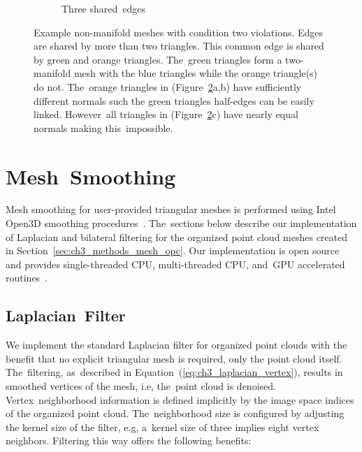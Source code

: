 \begin{figure}[H]
\begin{subfigure}{.30\linewidth}
    \caption{Three shared~edges\label{fig:ch3_NonMainifoldCond2C}}\vspace{6pt}
  \end{subfigure}
  \caption[Example non-manifold meshes with condition two violations]{Example non-manifold meshes with condition two violations. Edges are shared by more than two triangles. This common edge is shared by green and orange triangles. The~green triangles form a two-manifold mesh with the blue triangles while the orange triangle(s) do not. The~orange triangles in (Figure~\ref{fig:ch3_NonMainifoldCond2}a,b) have sufficiently different normals such the green triangles half-edges can be easily linked. However~all triangles in (Figure~\ref{fig:ch3_NonMainifoldCond2}c) have nearly equal normals making this~impossible.}\label{fig:ch3_NonMainifoldCond2}
\end{figure}
\unskip




\section{Mesh~Smoothing}\label{sec:ch3_methods_mesh_smoothing}

Mesh smoothing for user-provided triangular meshes is performed using Intel Open3D smoothing procedures~\cite{zhou_open3d_2018}.  The~sections below describe our implementation of Laplacian and bilateral filtering for the organized point cloud meshes created in Section~\ref{sec:ch3_methods_mesh_opc}.  Our implementation is open source and provides single-threaded CPU, multi-threaded CPU, and~GPU accelerated routines~\cite{Castagno_Github_opf}. 

\subsection{Laplacian~Filter}\label{sec:ch3_methods_mesh_smoothing_laplacian}

We implement the standard Laplacian filter for organized point clouds with the benefit that no explicit triangular mesh is required, only the point cloud itself. The~filtering, as~described in Equation~(\ref{eq:ch3_laplacian_vertex}), results in smoothed vertices of the mesh, i.e, the~point cloud is denoised. Vertex~neighborhood information is defined implicitly by the image space indices of the organized point cloud.  The~neighborhood size is configured by adjusting the kernel size of the filter, e.g, a~kernel size of three implies eight vertex neighbors. Filtering this way offers the following benefits:

